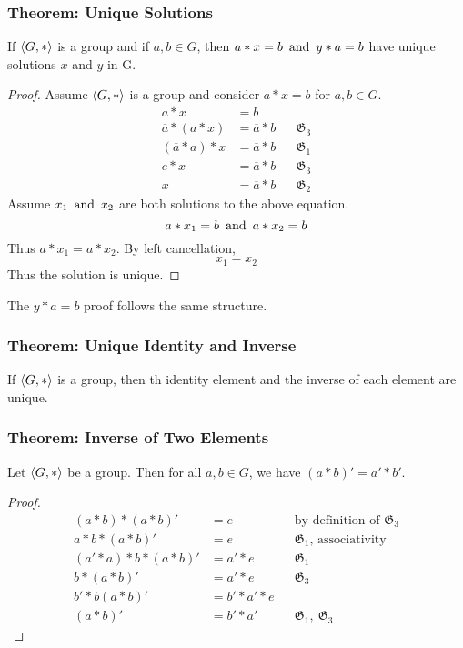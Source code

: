\subsubsection*{Theorem: Unique Solutions}
If $\langle G,* \rangle$ is a group and if $a,b \in G$, then $a*x=b \operatorname{~\text{and}~} y*a=b$ have unique solutions $x$ and $y$ in G.
\begin{proof}
    Assume $\langle G,* \rangle$ is a group and consider $a*x=b$ for $a,b \in G$.
    \begin{align*}
        a*x & = b \\
        \overline{a} * (a*x) & = \overline{a} * b && \mathfrak{G}_3 \\
        (\overline{a} * a) *x & = \overline{a} * b && \mathfrak{G}_1 \\
        e * x & = \overline{a} * b && \mathfrak{G}_3 \\
        x & = \overline{a} * b && \mathfrak{G}_2
    \end{align*}
    Assume $x_1 \operatorname{~\text{and}~} x_2$ are both solutions to the above equation.
    \[
        a*x_1 =b \operatorname{~\text{and}~} a * x_2 = b
    \]
    Thus $a*x_1 = a*x_2$. By left cancellation,
    \[
        x_1 = x_2
    \]
    Thus the solution is unique.
\end{proof}
The $y*a=b$ proof follows the same structure.

\subsubsection*{Theorem: Unique Identity and Inverse}
If $\langle G,* \rangle$ is a group, then th identity element and the inverse of each element are unique.

\subsubsection*{Theorem: Inverse of Two Elements}
Let $\langle G,* \rangle$ be a group. Then for all $a,b \in G$, we have $(a*b)' = a' * b'$.
\begin{proof}
    \begin{align*}
        (a*b)*(a*b)' & = e && \text{by definition of $\mathfrak{G}_3$} \\
        a*b*(a*b)' & = e && \text{$\mathfrak{G}_1$, associativity} \\
        (a'*a)*b*(a*b)' & = a'*e && \mathfrak{G}_1 \\
        b*(a*b)' & = a'*e && \mathfrak{G}_3 \\
        b'*b(a*b)' & = b'*a'*e \\
        (a*b)' & = b'*a' && \mathfrak{G}_1,~\mathfrak{G}_3
    \end{align*}
\end{proof}

